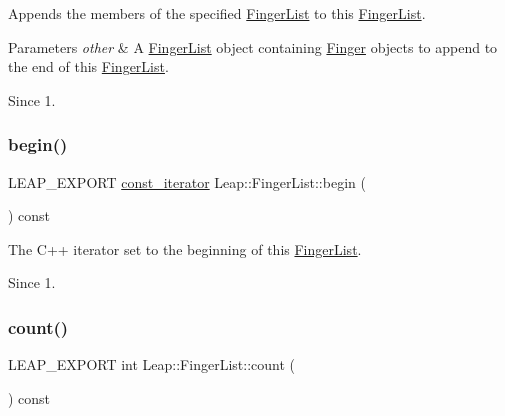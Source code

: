 Appends the members of the specified \hyperlink{class_leap_1_1_finger_list}{Finger\+List} to this \hyperlink{class_leap_1_1_finger_list}{Finger\+List}. 
\begin{DoxyParams}{Parameters}
{\em other} & A \hyperlink{class_leap_1_1_finger_list}{Finger\+List} object containing \hyperlink{class_leap_1_1_finger}{Finger} objects to append to the end of this \hyperlink{class_leap_1_1_finger_list}{Finger\+List}. \\
\hline
\end{DoxyParams}
\begin{DoxySince}{Since}
1. 
\end{DoxySince}
\mbox{\label{class_leap_1_1_finger_list_aaa68dfcacf93dd09271a746fb90c7523}} 
\subsubsection{\texorpdfstring{begin()}{begin()}}
{\footnotesize\ttfamily L\+E\+A\+P\+\_\+\+E\+X\+P\+O\+RT \hyperlink{class_leap_1_1_finger_list_a9ecff6e555096064a09bb66a8cb5e567}{const\+\_\+iterator} Leap\+::\+Finger\+List\+::begin (\begin{DoxyParamCaption}{ }\end{DoxyParamCaption}) const}

The C++ iterator set to the beginning of this \hyperlink{class_leap_1_1_finger_list}{Finger\+List}.


\begin{DoxyCodeInclude}
\end{DoxyCodeInclude}


\begin{DoxySince}{Since}
1. 
\end{DoxySince}
\mbox{\label{class_leap_1_1_finger_list_a5a542e9e6c894f1856997f0fb605e8b7}} 
\subsubsection{\texorpdfstring{count()}{count()}}
{\footnotesize\ttfamily L\+E\+A\+P\+\_\+\+E\+X\+P\+O\+RT int Leap\+::\+Finger\+List\+::count (\begin{DoxyParamCaption}{ }\end{DoxyParamCaption}) const}

